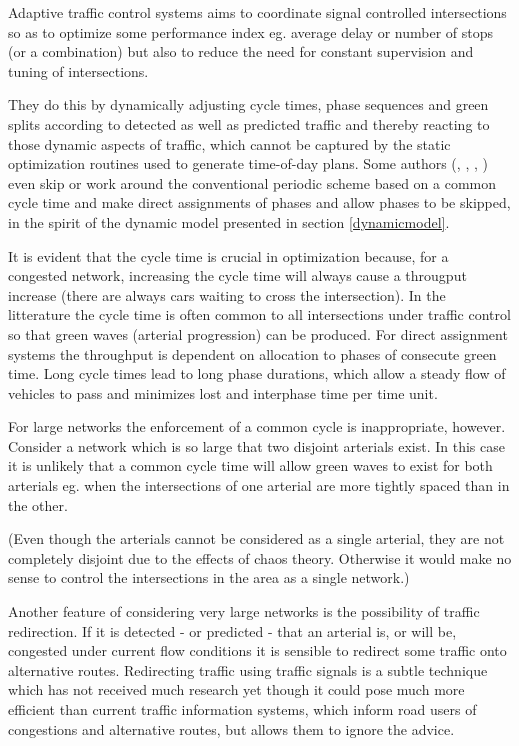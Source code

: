\label{adaptive_cooperation}
Adaptive traffic control systems aims to coordinate signal controlled intersections so as to optimize some performance index eg. average delay or number of stops (or a combination) but also to reduce the need for constant supervision and tuning of intersections.

They do this by dynamically adjusting cycle times, phase sequences and green splits according to detected as well as predicted traffic and thereby reacting to those dynamic aspects of traffic, which cannot be captured by the static optimization routines used to generate time-of-day plans. Some authors (\cite{1}, \cite{44}, \cite{46}, \cite{scoot2004}) even skip or work around the conventional periodic scheme based on a common cycle time and make direct assignments of phases and allow phases to be skipped, in the spirit of the dynamic model presented in section \ref{dynamicmodel}. 

It is evident that the cycle time is crucial in optimization because, for a congested network, increasing the cycle time will always cause a througput increase (there are always cars waiting to cross the intersection). In the litterature the cycle time is often common to all intersections under traffic control so that green waves (arterial progression) can be produced. For direct assignment systems the throughput is dependent on allocation to phases of consecute green time. Long cycle times lead to long phase durations, which allow a steady flow of vehicles to pass and minimizes lost and interphase time per time unit.

For large networks the enforcement of a common cycle is inappropriate, however. Consider a network which is so large that two disjoint arterials exist. In this case it is unlikely that a common cycle time will allow green waves to exist for both arterials eg. when the intersections of one arterial are more tightly spaced than in the other.

(Even though the arterials cannot be considered as a single arterial, they are not completely disjoint due to the effects of chaos theory. Otherwise it would make no sense to control the intersections in the area as  a single network.)

Another feature of considering very large networks is the possibility of traffic redirection. If it is detected - or predicted - that an arterial is, or will be, congested under current flow conditions it is sensible to redirect some traffic onto alternative routes. 
Redirecting traffic using traffic signals is a subtle technique which has not received much research yet though it could pose much more efficient than current traffic information systems, which inform road users of congestions and alternative routes, but allows them to ignore the advice.

